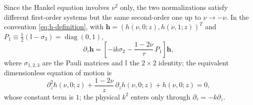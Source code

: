 \documentclass[11pt,a4paper]{article}
\numberwithin{table}{section}
\newcommand{\ii}{\mathrm i}
\newcommand{\Id}{\mathbb I}
\newcommand{\diag}{\operatorname{diag}}
\begin{document}
Since the Hankel equation involves $\nu^2$ only, the two normalizations satisfy different
first-order systems but the same second-order one up to $\nu\to-\nu$. In the convention
\eqref{eq:h-definition}, with $\bm h=(h(\nu,0;z),h(\nu,1;z))^T$ and
$P_1\equiv\tfrac12(\Id-\sigma_3)=\diag(0,1)$,
\begin{equation}
  \partial_\tau\bm h
  =\left[-\ii k\sigma_2-\frac{1-2\nu}{\tau}\,P_1\right]\bm h,
  \label{eq:h-first-order-system}
\end{equation}
where $\sigma_{1,2,3}$ are the Pauli matrices and $\Id$ the $2\times2$ identity; the equivalent
dimensionless equation of motion is
\begin{equation}
  \partial_z^2h(\nu,0;z)+\frac{1-2\nu}{z}\,\partial_zh(\nu,0;z)+h(\nu,0;z)=0,
  \label{eq:h-dimensionless-eom}
\end{equation}
whose constant term is $1$; the physical $k^2$ enters only through $\partial_\tau=-k\partial_z$.
\end{document}

